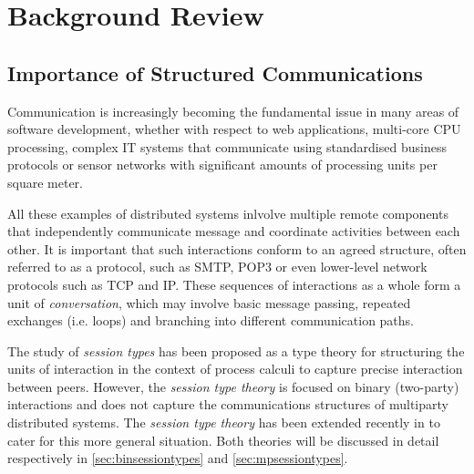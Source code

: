 

\chapter{Background Review}
\label{ch:background}


\section{Importance of Structured Communications}
\label{sec:structuredcommms}

Communication is increasingly becoming the fundamental issue in many areas of software development, whether with respect to web applications, multi-core CPU processing, complex IT systems that communicate using standardised business protocols or sensor networks with significant amounts of processing units per square meter\cite{sessionbased_programming}.

All these examples of distributed systems inlvolve multiple remote components that independently communicate message and coordinate activities between each other. It is important that such interactions conform to an agreed structure, often referred to as a protocol, such as SMTP, POP3\cite{sess_type_guided_distr_interact} or even lower-level network protocols such as TCP and IP. These sequences of interactions as a whole form a unit of \textit{conversation}, which may involve basic message passing, repeated exchanges (i.e. loops) and branching into different communication paths\cite{sessionbased_programming}.

The study of \textit{session types} has been proposed as a type theory for structuring the units of interaction in the context of process calculi to capture precise interaction between peers\cite{sessionbased_programming, sess_type_guided_distr_interact}. However, the \textit{session type theory} is focused on binary (two-party) interactions and does not capture the communications structures of multiparty distributed systems. The \textit{session type theory} has been extended recently in \cite{multiparty_sess_types} to cater for this more general situation. Both theories will be discussed in detail respectively in \autoref{sec:binsessiontypes} and \ref{sec:mpsessiontypes}.




